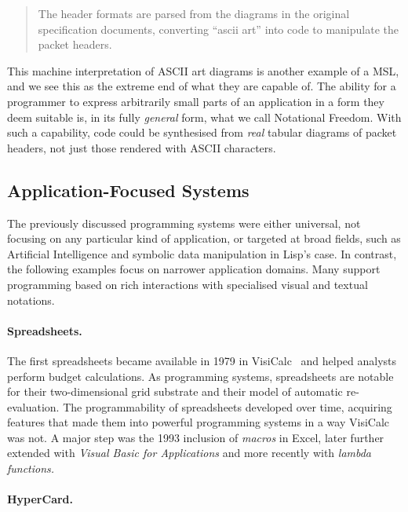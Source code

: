 \documentclass[ twoside,openright,titlepage,numbers=noenddot,headinclude,footinclude,cleardoublepage=empty,abstract=on,
                BCOR=5mm,paper=a4,fontsize=11pt
                ]{scrreprt}
\theoremstyle{definition}
\begin{document}
\begin{quote}
The header formats are parsed from the diagrams in the original
specification documents, converting ``ascii art'' into code to
manipulate the packet headers.
\end{quote}

This machine interpretation of ASCII art diagrams is another example of
a \ac{MSL}, and we see this as the extreme end of what they are capable
of. The ability for a programmer to express arbitrarily small parts of
an application in a form they deem suitable is, in its fully
\emph{general} form, what we call Notational Freedom. With such a
capability, code could be synthesised from \emph{real} tabular diagrams
of packet headers, not just those rendered with ASCII characters.

\hypertarget{application-focused-systems}{\subsection{Application-Focused
Systems}\label{application-focused-systems}}

The previously discussed programming systems were either universal, not
focusing on any particular kind of application, or targeted at broad
fields, such as Artificial Intelligence and symbolic data manipulation
in Lisp's case. In contrast, the following examples focus on narrower
application domains. Many support programming based on rich interactions
with specialised visual and textual notations.

\paragraph{Spreadsheets.}

The first spreadsheets became available in 1979 in
VisiCalc~\parencite{VisiCalc, VisiCalc2} and helped analysts perform
budget calculations. As programming systems, spreadsheets are notable
for their two-dimensional grid substrate and their model of automatic
re-evaluation. The programmability of spreadsheets developed over time,
acquiring features that made them into powerful programming systems in a
way VisiCalc was not. A major step was the 1993 inclusion of
\emph{macros} in Excel, later further extended with \emph{Visual Basic
for Applications} and more recently with \emph{lambda functions.}

\paragraph{HyperCard.}
\end{document}
